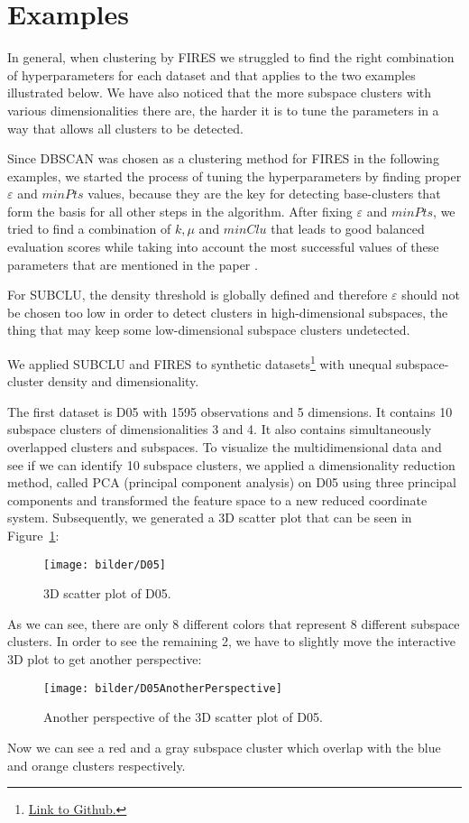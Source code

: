 \section{Examples}\raggedbottom

In general, when clustering by FIRES we struggled to find the right combination of hyperparameters for each dataset and that applies to the two examples illustrated below. We have also noticed that the more subspace clusters with various dimensionalities there are, the harder it is to tune the parameters in a way that allows all clusters to be detected.

Since DBSCAN was chosen as a clustering method for FIRES in the following examples, we started the process of tuning the hyperparameters by finding proper $\varepsilon$ and $minPts$ values, because they are the key for detecting base-clusters that form the basis for all other steps in the algorithm. After fixing $\varepsilon$ and $minPts$, we tried to find a combination of $k, \mu$ and $minClu$ that leads to good balanced evaluation scores while taking into account the most successful values of these parameters that are mentioned in the paper \citep{fires}.

For SUBCLU, the density threshold is globally defined and therefore $\varepsilon$ should not be chosen too low in order to detect clusters in high-dimensional subspaces, the thing that may keep some low-dimensional subspace clusters undetected.

We applied SUBCLU and FIRES to synthetic datasets\footnote{\href{https://github.com/david-c-hunn/edu.uwb.opensubspace/tree/master/edu.uwb.opensubspace/Databases}{Link to Github.}} with unequal subspace-cluster density and dimensionality. 

The first dataset is D05 with 1595 observations and 5 dimensions. It contains 10 subspace clusters of dimensionalities 3 and 4. It also contains simultaneously overlapped clusters and subspaces. To visualize the multidimensional data and see if we can identify 10 subspace clusters, we applied a dimensionality reduction method, called PCA (principal component analysis) on D05 using three principal components and transformed the feature space to a new reduced coordinate system. Subsequently, we generated a 3D scatter plot that can be seen in Figure~\ref{fig:D05}:
\begin{figure}[H]
	\centering
	\centering
	\texttt{[image: bilder/D05]}
	\caption{3D scatter plot of D05.}
	\label{fig:D05}
\end{figure}
As we can see, there are only 8 different colors that represent 8 different subspace clusters. In order to see the remaining 2, we have to slightly move the interactive 3D plot to get another perspective:
\begin{figure}[H]
	\centering
	\texttt{[image: bilder/D05AnotherPerspective]}
	\caption{Another perspective of the 3D scatter plot of D05.}
	\label{fig:D05AnotherPerspective}
\end{figure}
Now we can see a red and a gray subspace cluster which overlap with the blue and orange clusters respectively.


